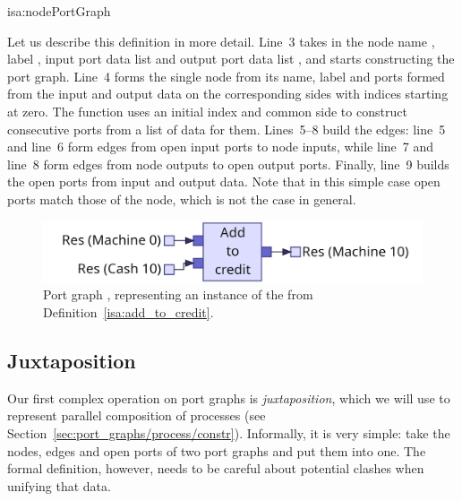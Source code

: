 \documentclass[class=smolathesis,crop=false]{standalone}
\begin{document}
\begin{isadef}{isa:nodePortGraph}
  \begin{linenumbers*}
    
  \end{linenumbers*}
\end{isadef}

Let us describe this definition in more detail.
Line~3 takes in the node name , label , input port data list  and output port data list , and starts constructing the port graph.
Line~4 forms the single node from its name, label and ports formed from the input and output data on the corresponding sides with indices starting at zero.
The function  uses an initial index and common side to construct consecutive ports from a list of data for them.
Lines~5--8 build the edges: line~5 and line~6 form edges from open input ports to node inputs, while line~7 and line~8 form edges from node outputs to open output ports.
Finally, line~9 builds the open ports from input and output data.
Note that in this simple case open ports match those of the node, which is not the case in general.

\begin{figure}[htbp]
  \centering
  \includegraphics[scale=0.2]{img/add_to_credit_port_graph.png}
  \caption{Port graph , representing an instance of the  from Definition~\ref{isa:add_to_credit}.}
  \label{fig:node_port_graph}
\end{figure}

\subsection{Juxtaposition}
\label{sec:port_graphs/mech/par}

Our first complex operation on port graphs is \emph{juxtaposition}, which we will use to represent parallel composition of processes (see Section~\ref{sec:port_graphs/process/constr}).
Informally, it is very simple: take the nodes, edges and open ports of two port graphs and put them into one.
The formal definition, however, needs to be careful about potential clashes when unifying that data.
\end{document}
